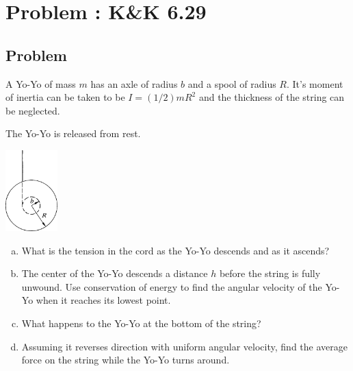 \documentclass[solutions]{esg8012pset}
\begin{document}
\section{Problem \thesection: K\&K 6.29}
\subsection{Problem}
  A Yo-Yo of mass $m$ has an axle of radius $b$ and a spool of radius $R$. It's moment of inertia can be taken to be $I = (1/2)mR^2$ and the thickness of the string can be neglected.

  The Yo-Yo is released from rest.
  \begin{center}\includegraphics[width=0.15\textwidth]{ps09_4}\end{center}
  \begin{enumerate}[(a)]
    \item What is the tension in the cord as the Yo-Yo descends and as it ascends?
    \item The center of the Yo-Yo descends a distance $h$ before the string is fully unwound. Use conservation of energy to find the angular velocity of the Yo-Yo when it reaches its lowest point.
    \item What happens to the Yo-Yo at the bottom of the string?
    \item Assuming it reverses direction with uniform angular velocity, find the average force on the string while the Yo-Yo turns around.
  \end{enumerate}
\end{document}
